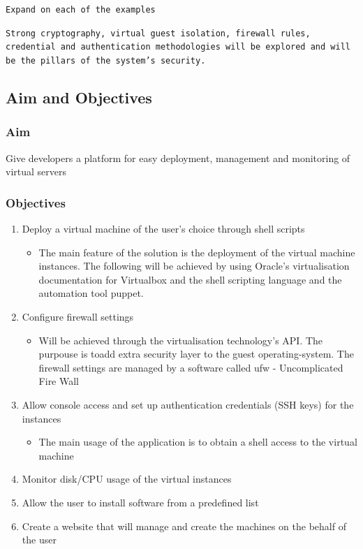 \documentclass{article}
\begin{document}
\texttt{Expand  on each of the examples}

\texttt{Strong cryptography, virtual guest isolation, firewall rules, credential and authentication methodologies will be explored and will be the pillars of the system's security.}
\subsection{Aim and Objectives}
\subsubsection{Aim}
Give developers a platform for easy deployment, management and monitoring of virtual servers
\subsubsection{Objectives}

\begin{enumerate}
    \item Deploy a virtual machine of the user's choice through shell scripts
          \begin{itemize}
              \item The main feature of the solution is the deployment of the virtual machine instances. The following will be achieved by using Oracle's virtualisation documentation for Virtualbox and the shell scripting language and the automation tool puppet.
          \end{itemize}

    \item Configure firewall settings
          \begin{itemize}
              \item Will be achieved through the virtualisation technology's API. The purpouse is toadd extra security layer to the guest \gls{operating-system}. The firewall settings are managed by a software called ufw - Uncomplicated Fire Wall
          \end{itemize}

    \item Allow console access and set up authentication credentials (SSH keys) for the instances
          \begin{itemize}
              \item The main usage of the application is to obtain a shell access to the virtual machine
          \end{itemize}
    \item Monitor disk/CPU usage of the virtual instances
    \item Allow the user to install software from a predefined list
    \item Create a website that will manage and create the machines on the behalf of the user
\end{enumerate}
\end{document}
